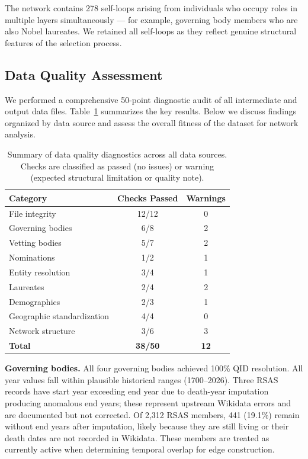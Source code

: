 \documentclass[11pt]{article}
\begin{document}
The network contains 278 self-loops arising from individuals who occupy roles in multiple layers simultaneously --- for example, governing body members who are also Nobel laureates. We retained all self-loops as they reflect genuine structural features of the selection process.

\subsection{Data Quality Assessment}
\label{sec:diagnostics}

We performed a comprehensive 50-point diagnostic audit of all intermediate and output data files. Table~\ref{tab:diagnostics} summarizes the key results. Below we discuss findings organized by data source and assess the overall fitness of the dataset for network analysis.

\begin{table}[t!]
\footnotesize
\centering
\caption{Summary of data quality diagnostics across all data sources. Checks are classified as passed (no issues) or warning (expected structural limitation or quality note).\label{tab:diagnostics}}
\bigskip
\begin{tabular}{lcc}
\textbf{Category} & \textbf{Checks Passed} & \textbf{Warnings} \\ \hline
File integrity & 12/12 & 0 \\
Governing bodies & 6/8 & 2 \\
Vetting bodies & 5/7 & 2 \\
Nominations & 1/2 & 1 \\
Entity resolution & 3/4 & 1 \\
Laureates & 2/4 & 2 \\
Demographics & 2/3 & 1 \\
Geographic standardization & 4/4 & 0 \\
Network structure & 3/6 & 3 \\ \hline
\textbf{Total} & \textbf{38/50} & \textbf{12} \\
\end{tabular}
\end{table}

\textbf{Governing bodies.} All four governing bodies achieved 100\% QID resolution. All year values fall within plausible historical ranges (1700--2026). Three RSAS records have start year exceeding end year due to death-year imputation producing anomalous end years; these represent upstream Wikidata errors and are documented but not corrected. Of 2{,}312 RSAS members, 441 (19.1\%) remain without end years after imputation, likely because they are still living or their death dates are not recorded in Wikidata. These members are treated as currently active when determining temporal overlap for edge construction.
\end{document}

